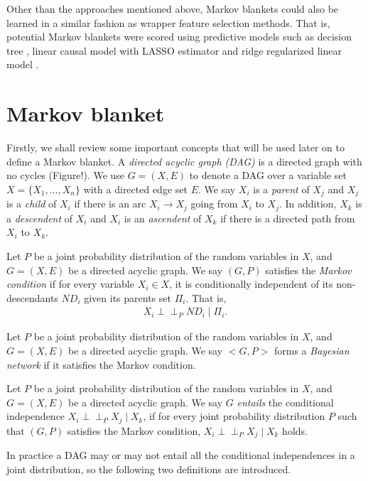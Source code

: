 Other than the approaches mentioned above, Markov blankets could also be learned in a similar fashion as wrapper feature selection methods. That is, potential Markov blankets were scored using predictive models such as decision tree \cite{frey2003identifying}, linear causal model with LASSO estimator \cite{li2004} and ridge regularized linear model \cite{strobl2016markov}.

\section{Markov blanket} 
\label{sec:mb}
Firstly, we shall review some important concepts that will be used later on to define a Markov blanket. A \textit{directed acyclic graph (DAG)} is a directed graph with no cycles (Figure!). We use $G=(X,E)$ to denote a DAG over a variable set $X=\{X_1, \dots, X_n\}$ with a directed edge set $E$. We say $X_i$ is a \textit{parent} of $X_j$ and $X_j$ is a \textit{child} of $X_i$ if there is an arc $X_i \rightarrow X_j$ going from $X_i$ to $X_j$. In addition, $X_k$ is a \textit{descendent} of $X_i$ and $X_i$ is an \textit{ascendent} of $X_k$ if there is a directed path from $X_i$ to $X_k$.
\begin{definition}
\label{def:markov}
Let $P$ be a joint probability distribution of the random variables in $X$, and $G=(X,E)$ be a directed acyclic graph. We say $(G, P)$ satisfies the \textit{Markov condition} if for every variable $X_i \in X$, it is conditionally independent of its non-descendants $ND_i$ given its parents set $\Pi_i$. That is,
\begin{align*}
X_i \!\perp\!\!\!\perp_P ND_i \mid \Pi_i.
\end{align*} 
\end{definition}

\begin{definition}
\label{def:bn}
Let $P$ be a joint probability distribution of the random variables in $X$, and $G=(X,E)$ be a directed acyclic graph. We say $<G, P>$ forms a \textit{Bayesian network} if it satisfies the Markov condition. 
\end{definition}

\begin{definition}
\label{def:entail}
Let $P$ be a joint probability distribution of the random variables in $X$, and $G=(X,E)$ be a directed acyclic graph. We say $G$ \textit{entails} the conditional independence $X_i \!\perp\!\!\!\perp_P X_j \mid X_k$, if for every joint probability distribution $P$ such that $(G, P)$ satisfies the Markov condition, $X_i \!\perp\!\!\!\perp_P X_j \mid X_k$ holds. 
\end{definition}
In practice a DAG may or may not entail all the conditional independences in a joint distribution, so the following two definitions are introduced. 

